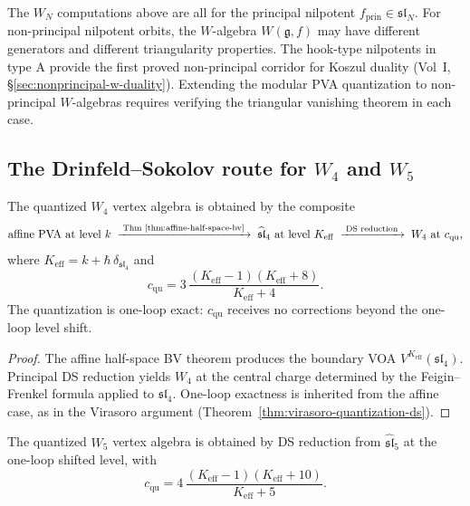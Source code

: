\begin{question}
The $W_N$ computations above are all for the principal nilpotent
$f_{\mathrm{prin}} \in \mathfrak{sl}_N$. For non-principal nilpotent
orbits, the $W$-algebra $W(\mathfrak{g}, f)$ may have different
generators and different triangularity properties. The hook-type
nilpotents in type A provide the first proved non-principal corridor
for Koszul duality
(Vol~I, \S\ref*{sec:nonprincipal-w-duality}).
Extending the modular PVA quantization to non-principal $W$-algebras
requires verifying the triangular vanishing theorem in each case.
\end{question}

\subsection{The Drinfeld--Sokolov route for $W_4$ and $W_5$}

\begin{theorem}
The quantized $W_4$ vertex algebra is obtained by the composite
\[
\text{affine PVA at level }k
\;\xrightarrow{\;\text{Thm~\ref{thm:affine-half-space-bv}}\;}
\;\widehat{\mathfrak{sl}}_4\text{ at level }K_{\mathrm{eff}}
\;\xrightarrow{\;\text{DS reduction}\;}
\;W_4\text{ at }c_{\mathrm{qu}},
\]
where $K_{\mathrm{eff}} = k + \hbar\,\delta_{\mathfrak{sl}_4}$ and
\[
c_{\mathrm{qu}}
=
3\,\frac{(K_{\mathrm{eff}}-1)(K_{\mathrm{eff}}+8)}{K_{\mathrm{eff}}+4}.
\]
The quantization is one-loop exact: $c_{\mathrm{qu}}$ receives no
corrections beyond the one-loop level shift.
\end{theorem}

\begin{proof}
The affine half-space BV theorem produces the boundary VOA
$V^{K_{\mathrm{eff}}}(\mathfrak{sl}_4)$. Principal DS reduction
yields $W_4$ at the central charge determined by the Feigin--Frenkel
formula applied to $\mathfrak{sl}_4$. One-loop exactness is inherited
from the affine case, as in the Virasoro argument
(Theorem~\ref{thm:virasoro-quantization-ds}).
\end{proof}

\begin{theorem}
The quantized $W_5$ vertex algebra is obtained by DS reduction from
$\widehat{\mathfrak{sl}}_5$ at the one-loop shifted level, with
\[
c_{\mathrm{qu}}
=
4\,\frac{(K_{\mathrm{eff}}-1)(K_{\mathrm{eff}}+10)}{K_{\mathrm{eff}}+5}.
\]
\end{theorem}

